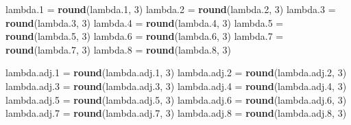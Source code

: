 \documentclass[
]{article}
\newenvironment{Shaded}{\begin{snugshade}}{\end{snugshade}}
\newcommand{\DecValTok}[1]{\textcolor[rgb]{0.00,0.00,0.81}{#1}}
\newcommand{\FloatTok}[1]{\textcolor[rgb]{0.00,0.00,0.81}{#1}}
\newcommand{\FunctionTok}[1]{\textcolor[rgb]{0.13,0.29,0.53}{\textbf{#1}}}
\newcommand{\NormalTok}[1]{#1}
\newcommand{\OtherTok}[1]{\textcolor[rgb]{0.56,0.35,0.01}{#1}}
\begin{document}
\begin{Shaded}
\begin{Highlighting}[]
\NormalTok{lambda}\FloatTok{.1} \OtherTok{=} \FunctionTok{round}\NormalTok{(lambda}\FloatTok{.1}\NormalTok{, }\DecValTok{3}\NormalTok{)}
\NormalTok{lambda}\FloatTok{.2} \OtherTok{=} \FunctionTok{round}\NormalTok{(lambda}\FloatTok{.2}\NormalTok{, }\DecValTok{3}\NormalTok{)}
\NormalTok{lambda}\FloatTok{.3} \OtherTok{=} \FunctionTok{round}\NormalTok{(lambda}\FloatTok{.3}\NormalTok{, }\DecValTok{3}\NormalTok{)}
\NormalTok{lambda}\FloatTok{.4} \OtherTok{=} \FunctionTok{round}\NormalTok{(lambda}\FloatTok{.4}\NormalTok{, }\DecValTok{3}\NormalTok{)}
\NormalTok{lambda}\FloatTok{.5} \OtherTok{=} \FunctionTok{round}\NormalTok{(lambda}\FloatTok{.5}\NormalTok{, }\DecValTok{3}\NormalTok{)}
\NormalTok{lambda}\FloatTok{.6} \OtherTok{=} \FunctionTok{round}\NormalTok{(lambda}\FloatTok{.6}\NormalTok{, }\DecValTok{3}\NormalTok{)}
\NormalTok{lambda}\FloatTok{.7} \OtherTok{=} \FunctionTok{round}\NormalTok{(lambda}\FloatTok{.7}\NormalTok{, }\DecValTok{3}\NormalTok{)}
\NormalTok{lambda}\FloatTok{.8} \OtherTok{=} \FunctionTok{round}\NormalTok{(lambda}\FloatTok{.8}\NormalTok{, }\DecValTok{3}\NormalTok{)}

\NormalTok{lambda.adj}\FloatTok{.1} \OtherTok{=} \FunctionTok{round}\NormalTok{(lambda.adj}\FloatTok{.1}\NormalTok{, }\DecValTok{3}\NormalTok{)}
\NormalTok{lambda.adj}\FloatTok{.2} \OtherTok{=} \FunctionTok{round}\NormalTok{(lambda.adj}\FloatTok{.2}\NormalTok{, }\DecValTok{3}\NormalTok{)}
\NormalTok{lambda.adj}\FloatTok{.3} \OtherTok{=} \FunctionTok{round}\NormalTok{(lambda.adj}\FloatTok{.3}\NormalTok{, }\DecValTok{3}\NormalTok{)}
\NormalTok{lambda.adj}\FloatTok{.4} \OtherTok{=} \FunctionTok{round}\NormalTok{(lambda.adj}\FloatTok{.4}\NormalTok{, }\DecValTok{3}\NormalTok{)}
\NormalTok{lambda.adj}\FloatTok{.5} \OtherTok{=} \FunctionTok{round}\NormalTok{(lambda.adj}\FloatTok{.5}\NormalTok{, }\DecValTok{3}\NormalTok{)}
\NormalTok{lambda.adj}\FloatTok{.6} \OtherTok{=} \FunctionTok{round}\NormalTok{(lambda.adj}\FloatTok{.6}\NormalTok{, }\DecValTok{3}\NormalTok{)}
\NormalTok{lambda.adj}\FloatTok{.7} \OtherTok{=} \FunctionTok{round}\NormalTok{(lambda.adj}\FloatTok{.7}\NormalTok{, }\DecValTok{3}\NormalTok{)}
\NormalTok{lambda.adj}\FloatTok{.8} \OtherTok{=} \FunctionTok{round}\NormalTok{(lambda.adj}\FloatTok{.8}\NormalTok{, }\DecValTok{3}\NormalTok{)}


\end{Highlighting}
\end{Shaded}
\end{document}
